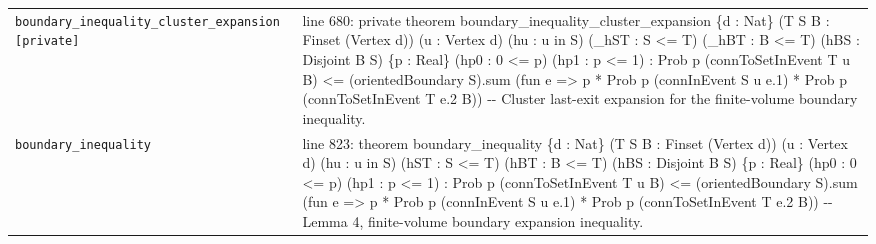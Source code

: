 \documentclass[10pt]{article}
\begin{document}
\begin{longtable}{>{\raggedright\arraybackslash}p{} >{\raggedright\arraybackslash}p{}}
\texttt{boundary\_\allowbreak{}inequality\_\allowbreak{}cluster\_\allowbreak{}expansion [private]} & {\ttfamily\scriptsize line 680:\allowbreak{} private theorem boundary\_\allowbreak{}inequality\_\allowbreak{}cluster\_\allowbreak{}expansion \{d :\allowbreak{} Nat\} (\allowbreak{}T S B :\allowbreak{} Finset (\allowbreak{}Vertex d)\allowbreak{})\allowbreak{} (\allowbreak{}u :\allowbreak{} Vertex d)\allowbreak{} (\allowbreak{}hu :\allowbreak{} u in S)\allowbreak{} (\allowbreak{}\_\allowbreak{}hST :\allowbreak{} S <=\allowbreak{} T)\allowbreak{} (\allowbreak{}\_\allowbreak{}hBT :\allowbreak{} B <=\allowbreak{} T)\allowbreak{} (\allowbreak{}hBS :\allowbreak{} Disjoint B S)\allowbreak{} \{p :\allowbreak{} Real\} (\allowbreak{}hp0 :\allowbreak{} 0 <=\allowbreak{} p)\allowbreak{} (\allowbreak{}hp1 :\allowbreak{} p <=\allowbreak{} 1)\allowbreak{} :\allowbreak{} Prob p (\allowbreak{}connToSetInEvent T u B)\allowbreak{} <=\allowbreak{} (\allowbreak{}orientedBoundary S)\allowbreak{}.\allowbreak{}sum (\allowbreak{}fun e =\allowbreak{}> p *\allowbreak{} Prob p (\allowbreak{}connInEvent S u e.\allowbreak{}1)\allowbreak{} *\allowbreak{} Prob p (\allowbreak{}connToSetInEvent T e.\allowbreak{}2 B)\allowbreak{})\allowbreak{} -\allowbreak{}-\allowbreak{} Cluster last-\allowbreak{}exit expansion for the finite-\allowbreak{}volume boundary inequality.\allowbreak{}} \\[0.45em]
\texttt{boundary\_\allowbreak{}inequality} & {\ttfamily\scriptsize line 823:\allowbreak{} theorem boundary\_\allowbreak{}inequality \{d :\allowbreak{} Nat\} (\allowbreak{}T S B :\allowbreak{} Finset (\allowbreak{}Vertex d)\allowbreak{})\allowbreak{} (\allowbreak{}u :\allowbreak{} Vertex d)\allowbreak{} (\allowbreak{}hu :\allowbreak{} u in S)\allowbreak{} (\allowbreak{}hST :\allowbreak{} S <=\allowbreak{} T)\allowbreak{} (\allowbreak{}hBT :\allowbreak{} B <=\allowbreak{} T)\allowbreak{} (\allowbreak{}hBS :\allowbreak{} Disjoint B S)\allowbreak{} \{p :\allowbreak{} Real\} (\allowbreak{}hp0 :\allowbreak{} 0 <=\allowbreak{} p)\allowbreak{} (\allowbreak{}hp1 :\allowbreak{} p <=\allowbreak{} 1)\allowbreak{} :\allowbreak{} Prob p (\allowbreak{}connToSetInEvent T u B)\allowbreak{} <=\allowbreak{} (\allowbreak{}orientedBoundary S)\allowbreak{}.\allowbreak{}sum (\allowbreak{}fun e =\allowbreak{}> p *\allowbreak{} Prob p (\allowbreak{}connInEvent S u e.\allowbreak{}1)\allowbreak{} *\allowbreak{} Prob p (\allowbreak{}connToSetInEvent T e.\allowbreak{}2 B)\allowbreak{})\allowbreak{} -\allowbreak{}-\allowbreak{} Lemma 4,\allowbreak{} finite-\allowbreak{}volume boundary expansion inequality.\allowbreak{}} \\[0.45em]
\end{longtable}
\end{document}
